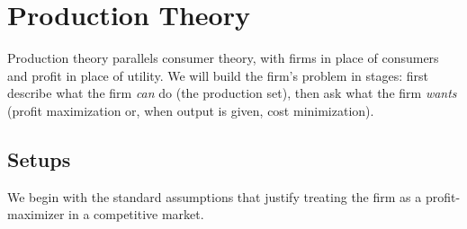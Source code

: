 \chapter{Production Theory}

Production theory parallels consumer theory, with firms in place of
consumers and profit in place of utility. We will build the firm's
problem in stages: first describe what the firm \emph{can} do (the
production set), then ask what the firm \emph{wants} (profit
maximization or, when output is given, cost minimization).

\section{Setups}\label{setups-2}

We begin with the standard assumptions that justify treating the firm
as a profit-maximizer in a competitive market.

